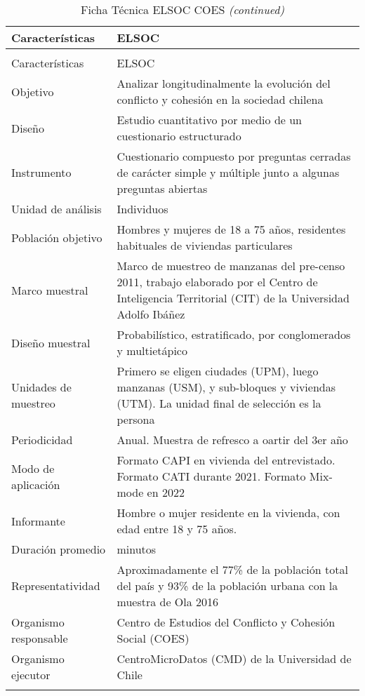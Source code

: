 \documentclass[
  12pt,
]{article}
\begin{document}
\begin{longtable}[t]{>{\raggedright\arraybackslash}p{8em}>{\raggedright\arraybackslash}p{35em}}
\caption{\label{tab:ficha}Ficha Técnica ELSOC COES}\\
\toprule
Características & ELSOC\\
\midrule
\endfirsthead
\caption[]{\label{tab:ficha}Ficha Técnica ELSOC COES \textit{(continued)}}\\
\toprule
Características & ELSOC\\
\midrule
\endhead

\endfoot
\bottomrule
\endlastfoot
Objetivo & Analizar longitudinalmente la evolución del conflicto y cohesión
                              en la sociedad chilena\\
Diseño & Estudio cuantitativo por medio de un cuestionario estructurado\\
Instrumento & Cuestionario compuesto por preguntas cerradas de carácter simple y múltiple junto a algunas preguntas abiertas\\
Unidad de análisis & Individuos\\
Población objetivo & Hombres y mujeres de 18 a 75 años, residentes habituales de viviendas particulares\\
\addlinespace
Marco muestral & Marco de muestreo de manzanas del pre-censo 2011, trabajo elaborado por el Centro de Inteligencia Territorial (CIT) de la Universidad Adolfo Ibáñez\\
Diseño muestral & Probabilístico, estratificado, por conglomerados y multietápico\\
Unidades de muestreo & Primero se eligen ciudades (UPM), luego manzanas (USM), y sub-bloques y viviendas (UTM). La unidad final de selección es la persona\\
Periodicidad & Anual. Muestra de refresco a oartir del 3er año\\
Modo de aplicación & Formato CAPI en vivienda del entrevistado. Formato CATI durante 2021. Formato Mix-mode en 2022\\
\addlinespace
Informante & Hombre o mujer residente en la vivienda, con edad entre 18 y 75 años.\\
Duración promedio & 51 minutos\\
Representatividad & Aproximadamente el 77\% de la población total del país y 93\% de la
              población urbana con la muestra de Ola 2016\\
Organismo responsable & Centro de Estudios del Conflicto y Cohesión Social (COES)\\
Organismo ejecutor & CentroMicroDatos (CMD) de la Universidad de Chile\\*
\end{longtable}
\end{document}
